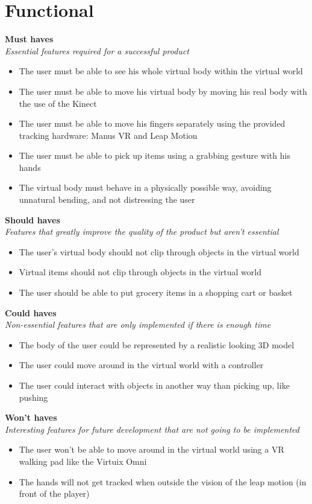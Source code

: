 \documentclass[11pt,a4paper]{report}
\begin{document}
\section{Functional}
\textbf{Must haves} \\
\textit{Essential features required for a successful product}
\begin{itemize}
\item The user must be able to see his whole virtual body within the virtual world
\item The user must be able to move his virtual body by moving his real body with the use of the Kinect
\item  The user must be able to move his fingers separately using the provided tracking hardware:
Manus VR and Leap Motion
\item The user must be able to pick up items using a grabbing gesture with his hands
\item The virtual body must behave in a physically possible way, avoiding unnatural bending, and not
distressing the user
\end{itemize}
\textbf{Should haves} \\
\textit{Features that greatly improve the quality of the product but aren't essential}
\begin{itemize}
\item The user’s virtual body should not clip through objects in the virtual world
\item Virtual items should not clip through objects in the virtual world
\item The user should be able to put grocery items in a shopping cart or basket
\end{itemize}  \newpage
\textbf{Could haves} \\
\textit{Non-essential features that are only implemented if there is enough time}
\begin{itemize}
\item The body of the user could be represented by a realistic looking 3D model
\item The user could move around in the virtual world with a controller
\item The user could interact with objects in another way than picking up, like pushing
\end{itemize}
\textbf{Won't haves} \\
\textit{Interesting features for future development that are not going to be implemented}
\begin{itemize}
\item The user won’t be able to move around in the virtual world using a VR walking pad like the Virtuix Omni
\item The hands will not get tracked when outside the vision of the leap motion (in front of the player)
\end{itemize}
\end{document}
